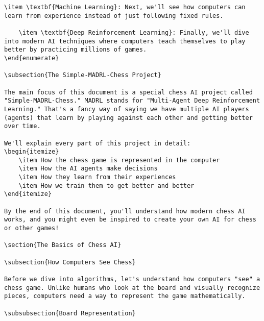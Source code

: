 \documentclass[11pt]{article}
\begin{document}
\begin{lstlisting}[style=Python]
    \item \textbf{Machine Learning}: Next, we'll see how computers can learn from experience instead of just following fixed rules.

    \item \textbf{Deep Reinforcement Learning}: Finally, we'll dive into modern AI techniques where computers teach themselves to play better by practicing millions of games.
\end{enumerate}

\subsection{The Simple-MADRL-Chess Project}

The main focus of this document is a special chess AI project called "Simple-MADRL-Chess." MADRL stands for "Multi-Agent Deep Reinforcement Learning." That's a fancy way of saying we have multiple AI players (agents) that learn by playing against each other and getting better over time.

We'll explain every part of this project in detail:
\begin{itemize}
    \item How the chess game is represented in the computer
    \item How the AI agents make decisions
    \item How they learn from their experiences
    \item How we train them to get better and better
\end{itemize}

By the end of this document, you'll understand how modern chess AI works, and you might even be inspired to create your own AI for chess or other games!

\section{The Basics of Chess AI}

\subsection{How Computers See Chess}

Before we dive into algorithms, let's understand how computers "see" a chess game. Unlike humans who look at the board and visually recognize pieces, computers need a way to represent the game mathematically.

\subsubsection{Board Representation}


\end{lstlisting}
\end{document}
